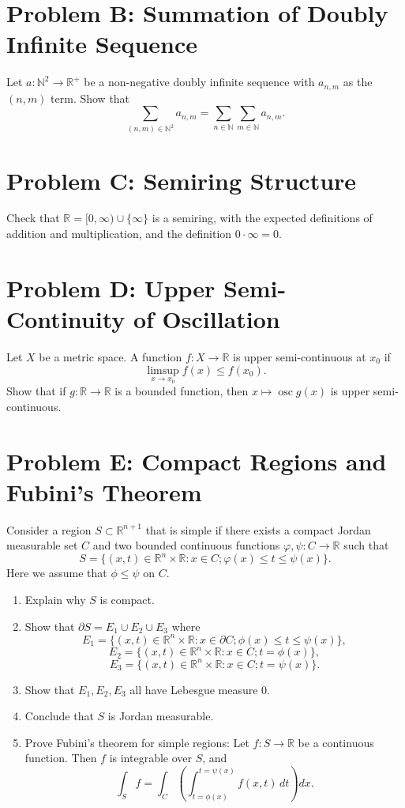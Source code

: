 \documentclass[lang=cn,11pt]{template}
\begin{document}
\section*{Problem B: Summation of Doubly Infinite Sequence}
Let \( a : \mathbb{N}^2 \rightarrow \mathbb{R}^+ \) be a non-negative doubly infinite sequence with \( a_{n,m} \) as the \((n,m)\) term. Show that
\[
\sum_{(n,m) \in \mathbb{N}^2} a_{n,m} = \sum_{n \in \mathbb{N}} \sum_{m \in \mathbb{N}} a_{n,m}.
\]

\section*{Problem C: Semiring Structure}
Check that \( \mathbb{R} = [0, \infty) \cup \{\infty\} \) is a semiring, with the expected definitions of addition and multiplication, and the definition \( 0 \cdot \infty = 0 \).

\section*{Problem D: Upper Semi-Continuity of Oscillation}
Let \( X \) be a metric space. A function \( f : X \rightarrow \mathbb{R} \) is upper semi-continuous at \( x_0 \) if
\[
\limsup_{x \rightarrow x_0} f(x) \leq f(x_0).
\]
Show that if \( g : \mathbb{R} \rightarrow \mathbb{R} \) is a bounded function, then \( x \mapsto \operatorname{osc} g(x) \) is upper semi-continuous.

\section*{Problem E: Compact Regions and Fubini's Theorem}
Consider a region \( S \subset \mathbb{R}^{n+1} \) that is simple if there exists a compact Jordan measurable set \( C \) and two bounded continuous functions \( \varphi, \psi : C \rightarrow \mathbb{R} \) such that
\[
S = \{ (x, t) \in \mathbb{R}^n \times \mathbb{R} : x \in C; \varphi(x) \leq t \leq \psi(x) \}.
\]
Here we assume that \( \phi \leq \psi \) on \( C \).

\begin{enumerate}
    \item Explain why \( S \) is compact.
    \item Show that \( \partial S = E_1 \cup E_2 \cup E_3 \) where
    \[
    E_1 = \{ (x, t) \in \mathbb{R}^n \times \mathbb{R} : x \in \partial C; \phi(x) \leq t \leq \psi(x) \},
    \]
    \[
    E_2 = \{ (x, t) \in \mathbb{R}^n \times \mathbb{R} : x \in C; t = \phi(x) \},
    \]
    \[
    E_3 = \{ (x, t) \in \mathbb{R}^n \times \mathbb{R} : x \in C; t = \psi(x) \}.
    \]
    \item Show that \( E_1, E_2, E_3 \) all have Lebesgue measure 0.
    \item Conclude that \( S \) is Jordan measurable.
    \item Prove Fubini's theorem for simple regions: Let \( f : S \to \mathbb{R} \) be a continuous function. Then \( f \) is integrable over \( S \), and
    \[
    \int_S f = \int_C \left( \int_{t = \phi(x)}^{t = \psi(x)} f(x, t) \, dt \right) dx.
    \]
\end{enumerate}
\end{document}
